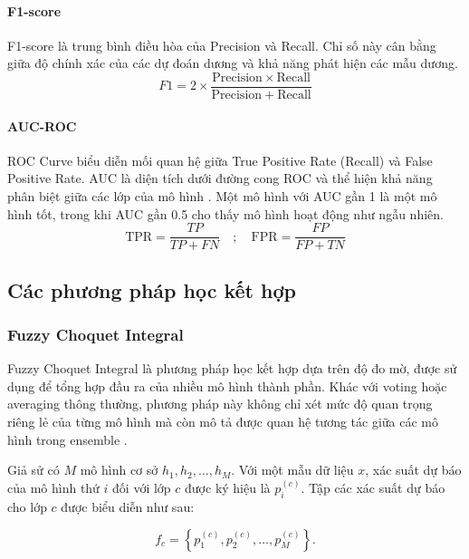 \documentclass[10pt,twoside]{article}
\begin{document}
\paragraph{F1-score} 
F1-score \cite{grandini_metrics_2020} là trung bình điều hòa của Precision và Recall. Chỉ số này cân bằng giữa độ chính xác của các dự đoán dương và khả năng phát hiện các mẫu dương.
\begin{equation} 
F1=2\times\frac{\mathrm{Precision}\times\mathrm{Recall}}{\mathrm{Precision}+\mathrm{Recall}}
\end{equation}
\paragraph{AUC-ROC} 
ROC Curve biểu diễn mối quan hệ giữa True Positive Rate (Recall) và False Positive Rate. AUC là diện tích dưới đường cong ROC và thể hiện khả năng phân biệt giữa các lớp của mô hình \cite{fawcett_introduction_2006}. Một mô hình với AUC gần 1 là một mô hình tốt, trong khi AUC gần 0.5 cho thấy mô hình hoạt động như ngẫu nhiên.
\begin{equation} 
\mathrm{TPR}=\frac{TP}{TP+FN}\quad;\quad \mathrm{FPR}=\frac{FP}{FP+TN}
\end{equation}


\subsection{Các phương pháp học kết hợp}

\subsubsection{Fuzzy Choquet Integral}
Fuzzy Choquet Integral là phương pháp học kết hợp dựa trên độ đo mờ, được sử dụng để tổng hợp đầu ra của nhiều mô hình thành phần. Khác với voting hoặc averaging thông thường, phương pháp này không chỉ xét mức độ quan trọng riêng lẻ của từng mô hình mà còn mô tả được quan hệ tương tác giữa các mô hình trong ensemble \cite{zadeh_fuzzy_1965, choquet_theory_1954}.

Giả sử có $M$ mô hình cơ sở $h_1,h_2,\ldots,h_M$. Với một mẫu dữ liệu $x$, xác suất dự báo của mô hình thứ $i$ đối với lớp $c$ được ký hiệu là $p_i^{(c)}$. Tập các xác suất dự báo cho lớp $c$ được biểu diễn như sau:

\begin{equation}
    f_c = \left\{p_1^{(c)}, p_2^{(c)}, \ldots, p_M^{(c)}\right\}.
\end{equation}
\end{document}
